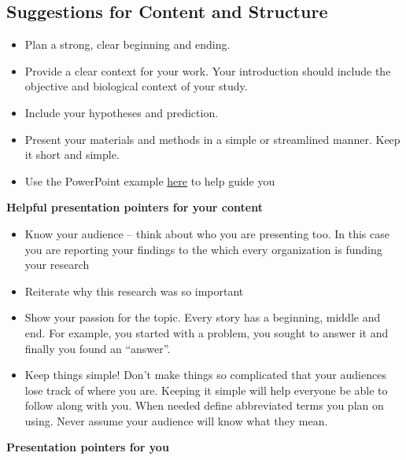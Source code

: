 \documentclass[
]{book}
\providecommand{\tightlist}{%
  \setlength{\itemsep}{0pt}\setlength{\parskip}{0pt}}
\begin{document}
\hypertarget{suggestions-for-content-and-structure}{%
\subsection*{Suggestions for Content and Structure}\label{suggestions-for-content-and-structure}}

\begin{itemize}
\tightlist
\item
  Plan a strong, clear beginning and ending.
\item
  Provide a clear context for your work. Your introduction should include the objective and biological context of your study.
\item
  Include your hypotheses and prediction.
\item
  Present your materials and methods in a simple or streamlined manner. Keep it short and simple.
\item
  Use the PowerPoint example \href{files/presentation_example.pdf}{here} to help guide you
\end{itemize}

\textbf{Helpful presentation pointers for your content}

\begin{itemize}
\tightlist
\item
  Know your audience -- think about who you are presenting too. In this case you are reporting your findings to the which every organization is funding your research
\item
  Reiterate why this research was so important
\item
  Show your passion for the topic. Every story has a beginning, middle and end. For example, you started with a problem, you sought to answer it and finally you found an ``answer''.
\item
  Keep things simple! Don't make things so complicated that your audiences lose track of where you are. Keeping it simple will help everyone be able to follow along with you. When needed define abbreviated terms you plan on using. Never assume your audience will know what they mean.
\end{itemize}

\textbf{Presentation pointers for you}
\end{document}

